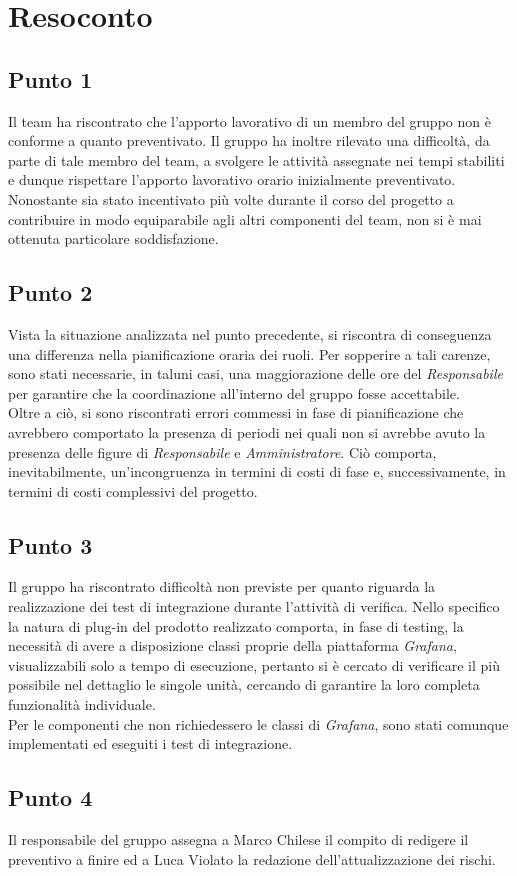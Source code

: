 \section{Resoconto}

\subsection{Punto 1}
Il team ha riscontrato che l'apporto lavorativo di un membro del gruppo non è conforme a quanto preventivato. Il gruppo ha inoltre rilevato una difficoltà, da parte di tale membro del team, a svolgere le attività assegnate nei tempi stabiliti e dunque rispettare l'apporto lavorativo orario inizialmente preventivato. Nonostante sia stato incentivato più volte durante il corso del progetto a contribuire in modo equiparabile agli altri componenti del team, non si è mai ottenuta particolare soddisfazione.\\

\subsection{Punto 2}
Vista la situazione analizzata nel punto precedente, si riscontra di conseguenza una differenza nella pianificazione oraria dei ruoli. Per sopperire a tali carenze, sono stati necessarie, in taluni casi, una maggiorazione delle ore del \textit{Responsabile} per garantire che la coordinazione all'interno del gruppo fosse accettabile.\\ 
Oltre a ciò, si sono riscontrati errori commessi in fase di pianificazione che avrebbero comportato la presenza di periodi nei quali non si avrebbe avuto la presenza delle figure di \textit{Responsabile} e \textit{Amministratore}.
Ciò comporta, inevitabilmente, un'incongruenza in termini di costi di fase e, successivamente, in termini di costi complessivi del progetto.

\subsection{Punto 3}
Il gruppo ha riscontrato difficoltà non previste per quanto riguarda la realizzazione dei test di integrazione durante l'attività di verifica. Nello specifico la natura di plug-in del prodotto realizzato comporta, in fase di testing, la necessità di avere a disposizione classi proprie della piattaforma \textit{Grafana}, visualizzabili solo a tempo di esecuzione, pertanto si è cercato di verificare il più possibile nel dettaglio le singole unità, cercando di garantire la loro completa funzionalità individuale.\\
Per le componenti che non richiedessero le classi di \textit{Grafana}, sono stati comunque implementati ed eseguiti i test di integrazione.

\subsection{Punto 4}
Il responsabile del gruppo assegna a Marco Chilese il compito di redigere il preventivo a finire ed a Luca Violato la redazione dell'attualizzazione dei rischi.